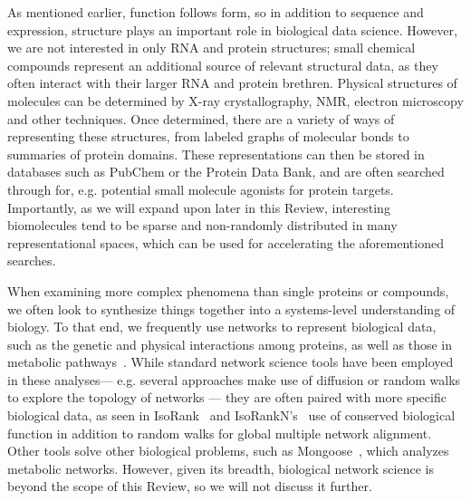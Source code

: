 \documentclass{acm_proc_article-sp}
\begin{document}
As mentioned earlier, function follows form, so in addition to
sequence and expression, structure plays an important role in biological data science.
However, we are not interested in only RNA and protein structures;
small chemical compounds represent an additional source of relevant structural data,
as they often interact with their larger RNA and protein brethren.
Physical structures of molecules can be determined by X-ray crystallography, NMR, electron microscopy and other 
techniques.
Once determined, there are a variety of ways of representing these structures, from labeled graphs of molecular bonds to summaries of protein domains.
These representations can then be stored in databases such as PubChem or the Protein Data Bank,
and are often searched through for, e.g. potential small molecule agonists for protein targets.
Importantly, as we will expand upon later in this Review, interesting biomolecules tend to be sparse and non-randomly distributed in many representational spaces, which can be used for accelerating the aforementioned searches.

When examining more complex phenomena than single proteins or compounds, we
often look to synthesize things together into a systems-level understanding of biology.
To that end, we frequently use
networks to represent biological data, such as the genetic
and physical interactions among proteins, as well as those in metabolic 
pathways~\cite{berger2013computational}.
While standard network science tools have been employed in these analyses---
e.g. several approaches make use of diffusion or random walks to explore the topology of networks \cite{cao2013going,cho2015diffusion}---
they are often paired with more specific biological data,
as seen in IsoRank~\cite{singh2008global} and IsoRankN's~\cite{liao2009isorankn} use of conserved biological function in addition to random walks for global multiple network alignment.
Other tools solve other biological problems, such as Mongoose~\cite{chindelevitch2014exact}, which 
analyzes metabolic networks.
However, given its breadth, biological network science is beyond the scope of this Review, so we will not discuss it further.

\end{document}

